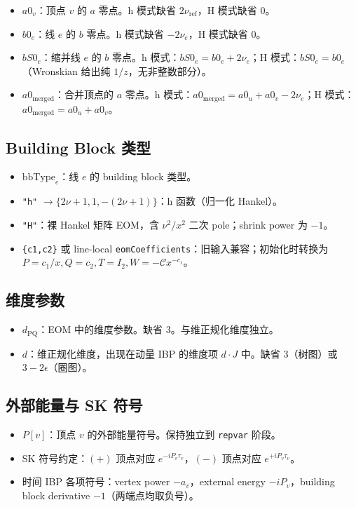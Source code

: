 ﻿\documentclass[a4paper,11pt]{article}
\begin{document}
\begin{itemize}
  \item $a0_v$：顶点 $v$ 的 $a$ 零点。h 模式缺省 $2\nu_{\text{ref}}$，H 模式缺省 $0$。
  \item $b0_e$：线 $e$ 的 $b$ 零点。h 模式缺省 $-2\nu_e$，H 模式缺省 $0$。
  \item $bS0_e$：缩并线 $e$ 的 $b$ 零点。h 模式：$bS0_e = b0_e + 2\nu_e$；H 模式：$bS0_e = b0_e$（Wronskian 给出纯 $1/z$，无非整数部分）。
  \item $a0_{\text{merged}}$：合并顶点的 $a$ 零点。h 模式：$a0_{\text{merged}} = a0_u + a0_v - 2\nu_e$；H 模式：$a0_{\text{merged}} = a0_u + a0_v$。
\end{itemize}

\subsection{Building Block 类型}

\begin{itemize}
  \item $\text{bbType}_e$：线 $e$ 的 building block 类型。
  \item \texttt{"h"} $\to \{2\nu+1, 1, -(2\nu+1)\}$：h 函数（归一化 Hankel）。
  \item \texttt{"H"}：裸 Hankel 矩阵 EOM，含 $\nu^2/x^2$ 二次 pole；shrink power 为 $-1$。
  \item \texttt{\{c1,c2\}} 或 line-local \texttt{eomCoefficients}：旧输入兼容；初始化时转换为 $P=c_1/x,Q=c_2,T=I_2,W=-\mathcal Cx^{-c_1}$。
\end{itemize}

\subsection{维度参数}

\begin{itemize}
  \item $d_{\text{PQ}}$：EOM 中的维度参数。缺省 $3$。与维正规化维度独立。
  \item $d$：维正规化维度，出现在动量 IBP 的维度项 $d \cdot J$ 中。缺省 $3$（树图）或 $3-2\epsilon$（圈图）。
\end{itemize}

\subsection{外部能量与 SK 符号}

\begin{itemize}
  \item $P[v]$：顶点 $v$ 的外部能量符号。保持独立到 \texttt{repvar} 阶段。
  \item SK 符号约定：$(+)$ 顶点对应 $e^{-iP_v \tau_v}$，$(-)$ 顶点对应 $e^{+iP_v \tau_v}$。
  \item 时间 IBP 各项符号：vertex power $-a_v$，external energy $-iP_v$，building block derivative $-1$（两端点均取负号）。
\end{itemize}
\end{document}
